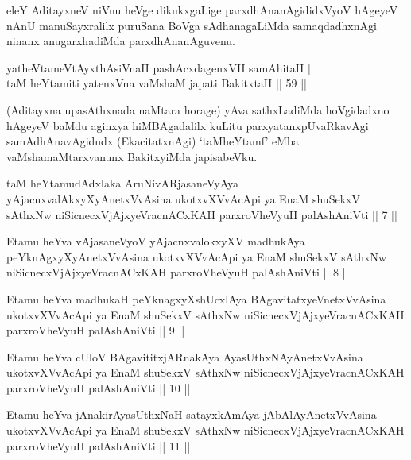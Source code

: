 \begin{artha}
eleY AditayxneV niVnu heVge dikukxgaLige parxdhAnanAgididxVyoV hAgeyeV 
nAnU manuSayxralilx puruSana BoVga sAdhanagaLiMda samaqdadhxnAgi 
ninanx anugarxhadiMda parxdhAnanAguvenu.
\end{artha}

\begin{shl}
yatheVtameVtAyxthA\s \s siVnaH pashAcxdagenxVH samAhitaH | \\
taM heYtamiti yatenxVna vaMshaM japati BakitxtaH \hfill|| 59 || 
\end{shl}

\begin{artha}
(Aditayxna upasAthxnada naMtara horage) yAva sathxLadiMda hoVgidadxno 
 hAgeyeV baMdu aginxya hiMBAgadalilx kuLitu parxyatanxpUvaRkavAgi 
samAdhAnavAgidudx (EkacitatxnAgi) `taMheYtamf' eMba 
vaMshamaMtarxvanunx BakitxyiMda japisabeVku.
\end{artha}

\begin{kandikeshl}
taM heYtamudAdxlaka AruNivARjasaneVyAya yAjacnxvalAkxyXyAnetxVvAsina ukotxvXVvAcApi ya EnaM shuSekxV sAthxNw niSicnecxVjAjxyeVracnACxKAH parxroVheVyuH palAshAniVti || 7 ||
\end{kandikeshl}

\begin{kandikeshl}
Etamu heYva vAjasaneVyoV yAjacnxvalokxyXV madhukAya peYknAgxyXyAnetxVvAsina ukotxvXVvAcApi ya EnaM shuSekxV sAthxNw niSicnecxVjAjxyeVracnACxKAH parxroVheVyuH palAshAniVti || 8 ||
\end{kandikeshl}

\begin{kandikeshl}
Etamu heYva madhukaH peYknagxyXshUcxlAya BAgavitatxyeV\s netxVvAsina ukotxvXVvAcApi ya EnaM shuSekxV sAthxNw niSicnecxVjAjxyeVracnACxKAH parxroVheVyuH palAshAniVti || 9 ||
\end{kandikeshl}

\begin{kandikeshl}
Etamu heYva cUloV BAgavititxjARnakAya AyasUthxNAyAnetxVvAsina ukotxvXVvAcApi ya EnaM shuSekxV sAthxNw niSicnecxVjAjxyeVracnACxKAH parxroVheVyuH palAshAniVti || 10 ||
\end{kandikeshl}

\begin{kandikeshl}
Etamu heYva jAnakirAyasUthxNaH satayxkAmAya jAbAlAyAnetxVvAsina ukotxvXVvAcApi ya EnaM shuSekxV sAthxNw niSicnecxVjAjxyeVracnACxKAH parxroVheVyuH palAshAniVti || 11 ||
\end{kandikeshl}

